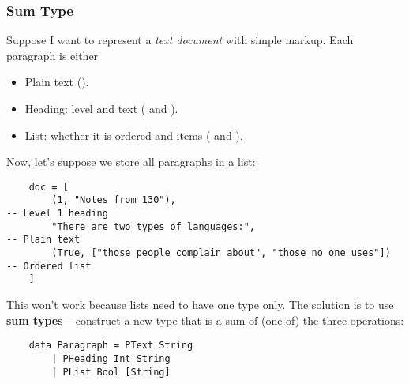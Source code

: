 \documentclass[letterpaper]{article}
\begin{document}
\subsubsection{Sum Type}
Suppose I want to represent a \emph{text document} with simple markup. Each paragraph is either 
\begin{itemize}
    \item Plain text ().
    \item Heading: level and text ( and ).
    \item List: whether it is ordered and items ( and \code{[String]}).
\end{itemize}
Now, let's suppose we store all paragraphs in a list: 
\begin{verbatim}
    doc = [
        (1, "Notes from 130"),                                        -- Level 1 heading 
        "There are two types of languages:",                          -- Plain text
        (True, ["those people complain about", "those no one uses"])  -- Ordered list
    ]
\end{verbatim}
This won't work because lists need to have one type only. The solution is to use \textbf{sum types} -- construct a new type that is a sum of (one-of) the three operations: 
\begin{verbatim}
    data Paragraph = PText String 
        | PHeading Int String 
        | PList Bool [String]
\end{verbatim}
\end{document}
